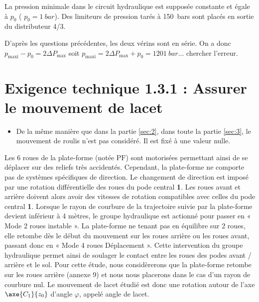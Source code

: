 \else
\fi



La pression minimale dans le circuit hydraulique est supposée constante et égale à $p_0$ ( $p_0 = \SI{1}{bar}$). Des limiteurs de pression tarés à \SI{150}{bars} sont placés en sortie du distributeur 4/3.

\ifprof
\begin{corrige}
D'après les questions précédentes, les deux vérins sont en série. On a donc $p_{\text{maxi}} - p_0 = 2 \Delta P_{\text{max}}$ soit 
$p_{\text{maxi}} = 2 \Delta P_{\text{max}} + p_0 = \SI{1201}{bar}$... chercher l'erreur.
\end{corrige}
\else
\fi


\section{\label{sec:3}Exigence technique 1.3.1 : Assurer le mouvement de lacet}

\begin{hypo}%

\begin{itemize}
\item De la même manière que dans la partie \ref{sec:2}, dans toute la partie \ref{sec:3}, le mouvement de roulis n’est pas considéré. Il est fixé à une valeur nulle.
\end{itemize}
\end{hypo}

\ifprof
\else

Les 6 roues de la plate-forme (notée $\text{PF}$) sont motorisées permettant ainsi de se déplacer sur des reliefs très
accidentés. Cependant, la plate-forme ne comporte pas de systèmes spécifiques de direction. Le changement de
direction est imposé par une rotation différentielle des roues du pode central \textbf{1}. Les roues avant et arrière doivent alors avoir des vitesses de rotation compatibles avec celles du pode central \textbf{1}. Lorsque le rayon de courbure de la trajectoire suivie par la plate-forme devient inférieur à 4 mètres, le groupe hydraulique est actionné pour passer en « Mode 2 roues instable ». La plate-forme ne tenant pas en équilibre sur 2 roues, elle retombe dès le début du mouvement sur les roues arrière ou les roues avant, passant donc en « Mode 4 roues Déplacement ». Cette intervention du groupe hydraulique permet ainsi de soulager le contact entre les roues des podes avant / arrière et le sol. Pour cette étude, nous considèrerons que la plate-forme retombe sur les roues arrière (annexe 9) et nous nous placerons dans le cas d’un rayon de courbure nul. Le mouvement de lacet étudié est donc une rotation autour de l’axe $\axe{C_1}{z_0}$ d’angle $\varphi$, appelé angle de lacet.

